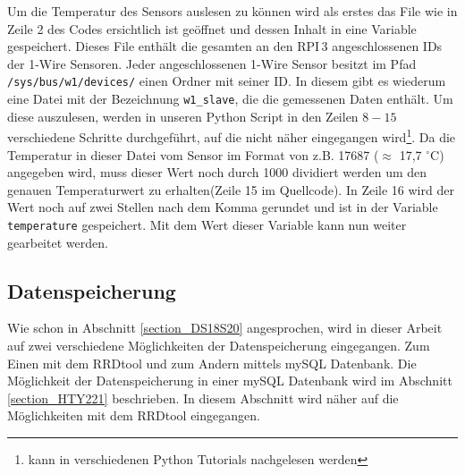 

Um die Temperatur des Sensors auslesen zu können wird als erstes das File wie in Zeile 2 des Codes ersichtlich ist geöffnet und dessen Inhalt in eine Variable gespeichert. Dieses File enthält die gesamten an den \ac{RPI}\,3 angeschlossenen IDs der 1-Wire Sensoren. Jeder angeschlossenen 1-Wire Sensor besitzt im Pfad \texttt{/sys/bus/w1/devices/} einen Ordner mit seiner ID. In diesem gibt es wiederum eine Datei mit der Bezeichnung \texttt{w1\_slave}, die die gemessenen Daten enthält. Um diese auszulesen, werden in unseren Python Script in den Zeilen $8-15$ verschiedene Schritte durchgeführt, auf die nicht näher eingegangen wird\footnote{kann in verschiedenen Python Tutorials nachgelesen werden}. Da die Temperatur in dieser Datei vom Sensor im Format von z.B. 17687 ($\approx$ 17,7 $^\circ$C) angegeben wird, muss dieser Wert noch durch 1000 dividiert werden um den genauen Temperaturwert zu erhalten(Zeile 15 im Quellcode). In Zeile 16 wird der Wert noch auf zwei Stellen nach dem Komma gerundet und ist in der Variable \texttt{temperature} gespeichert. Mit dem Wert dieser Variable kann nun weiter gearbeitet werden.

\subsection{Datenspeicherung}
\label{subsectio_Datenspeicherung_DS18S20}
Wie schon in Abschnitt \ref{section_DS18S20} angesprochen, wird in dieser Arbeit auf zwei verschiedene Möglichkeiten der Datenspeicherung eingegangen. Zum Einen mit dem RRDtool und zum Andern mittels mySQL Datenbank. Die Möglichkeit der Datenspeicherung in einer mySQL Datenbank wird im Abschnitt \ref{section_HTY221} beschrieben. In diesem Abschnitt wird näher auf die Möglichkeiten mit dem RRDtool eingegangen.

